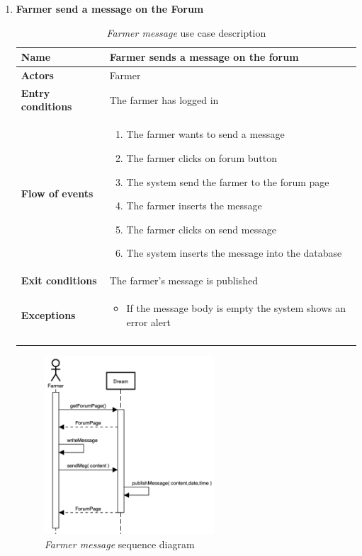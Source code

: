 \begin{enumerate}
    \item \textbf{Farmer send a message on the Forum}
        \begin{longtable}{p{0.26\linewidth}p{0.75\linewidth}}
            \toprule
            \textbf{Name} & \textbf{Farmer sends a message on the forum} \\
            \midrule
            \textbf{Actors} & Farmer \\
            \midrule
            \textbf{Entry conditions} & The farmer has logged in\\
            \midrule
            \textbf{Flow of events} & 
            \begin{enumerate}
                \item The farmer wants to send a message
                \item The farmer clicks on forum button
                \item The system send the farmer to the forum page
                \item The farmer inserts the message 
                \item The farmer clicks on send message
                \item The system inserts the message into the database 
            \end{enumerate} \\
            \midrule
            \textbf{Exit conditions} & The farmer's message is published\\
            \midrule
            \textbf{Exceptions} & 
            \begin{itemize}
                \item If the message body is empty the system shows an error alert
            \end{itemize} \\
            \bottomrule
            \caption{\emph{Farmer message} use case description}
        \end{longtable}

        \begin{figure}[H]
            \begin{center}
            \includegraphics[width=0.6\textwidth]{sequence/messageOnForum.png}
            \caption{\emph{Farmer message} sequence diagram}
            \label{fig:sequence3}
        \end{center}
        \end{figure}


\end{enumerate}
